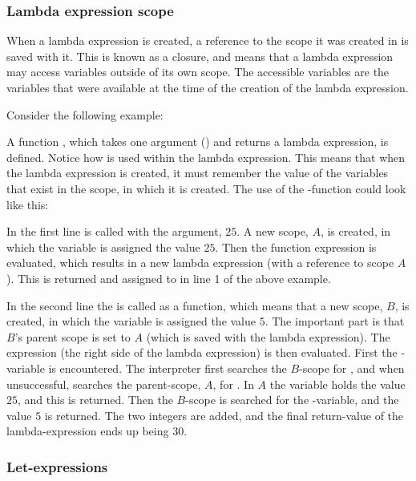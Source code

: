 \subsubsection{Lambda expression scope}

When a lambda expression is created, a reference to the scope it was created in
is saved with it. This is known as a closure, and means that a lambda
expression may access variables outside of its own scope. The accessible
variables are the variables that were available at the time of the creation of
the lambda expression.

Consider the following example:


A function , which takes one argument () and
returns a lambda expression, is defined. Notice how  is used within
the lambda expression. This means that when the lambda expression is created, it
must remember the value of the variables that exist in the scope, in which it is
created. The use of the -function could look like this:


In the first line  is called with the argument, $25$. A new scope, $A$,
is created, in which the variable  is assigned the value $25$. Then the function
expression is evaluated, which results in a new lambda expression (with a reference to scope $A$).
This is returned and assigned to  in line 1 of the above example.

In the second line the  is called as a function, which means that a new scope, $B$,
is created, in which the variable  is assigned the value $5$. The important part is
that $B$'s parent scope is set to $A$ (which is saved with the lambda expression). The expression
(the right side of the lambda expression) is then evaluated. First the -variable is
encountered. The interpreter first searches the $B$-scope for , and when unsuccessful,
searches the parent-scope, $A$, for . In $A$ the variable  holds the value
$25$, and this is returned. Then the $B$-scope is searched for the -variable, and the value
$5$ is returned. The two integers are added, and the final return-value of the lambda-expression
ends up being $30$.

\subsubsection{Let-expressions}

